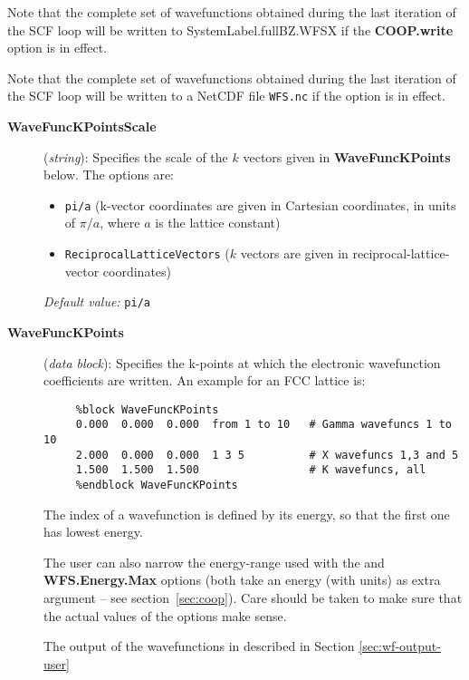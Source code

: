 Note that the complete set of wavefunctions obtained during the last
iteration of the SCF loop will be written to SystemLabel.fullBZ.WFSX
if the \textbf{COOP.write} option is in effect.

Note that the complete set of wavefunctions obtained during the last
iteration of the SCF loop will be written to a NetCDF file
\texttt{WFS.nc} if the  option is in effect.

\begin{description}

\item[\textbf{WaveFuncKPointsScale}] (\textit{string}):
Specifies the scale of the $k$ vectors given in
\textbf{WaveFuncKPoints} below.
The options are:
\begin{itemize}
\item \texttt{pi/a} (k-vector coordinates are given in Cartesian
coordinates, in units of $\pi/a$, where $a$ is the lattice constant)
\item \texttt{ReciprocalLatticeVectors} ($k$ vectors are given in
reciprocal-lattice-vector coordinates)
\end{itemize}

\textit{Default value:} \texttt{pi/a}


\item[\textbf{WaveFuncKPoints}] (\textit{data block}):
Specifies the k-points at which the electronic wavefunction
coefficients are written.
An example for an FCC lattice is:

\begin{verbatim}
     %block WaveFuncKPoints
     0.000  0.000  0.000  from 1 to 10   # Gamma wavefuncs 1 to 10
     2.000  0.000  0.000  1 3 5          # X wavefuncs 1,3 and 5
     1.500  1.500  1.500                 # K wavefuncs, all
     %endblock WaveFuncKPoints
\end{verbatim}

The index of a wavefunction is defined by its energy, so that the
first one has lowest energy.

The user can also narrow the energy-range used with the  and \textbf{WFS.Energy.Max} options (both take an
energy (with units) as extra argument -- see
section~\ref{sec:coop}). Care should be taken to make sure that the
actual values of the options make sense.

The output of the wavefunctions in described in Section \ref{sec:wf-output-user}


\end{description}
